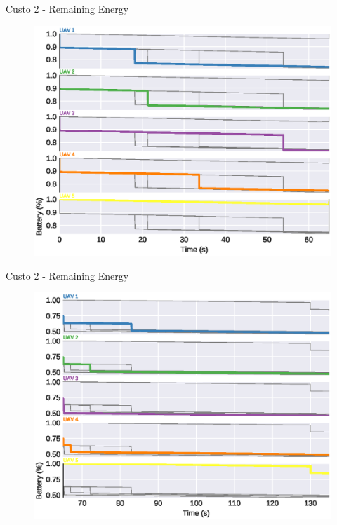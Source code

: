 \begin{frame}{Custo 2 - Remaining Energy}
                    \begin{figure}[!htb]
                        \includegraphics[width=\textwidth]{custo_2/uav_remaining_energy_65.eps}
                    \end{figure}
                \end{frame}\begin{frame}{Custo 2 - Remaining Energy}
                    \begin{figure}[!htb]
                        \includegraphics[width=\textwidth]{custo_2/uav_remaining_energy_135.eps}
                    \end{figure}

\end{frame}
